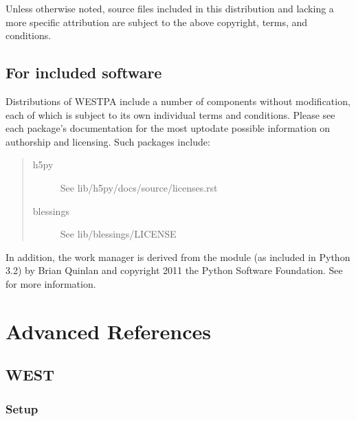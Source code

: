 \documentclass[letterpaper,10pt,english]{sphinxmanual}
\begin{document}
Unless otherwise noted, source files included in this distribution and
lacking a more specific attribution are subject to the above copyright,
terms, and conditions.


\section{For included software}
\label{\detokenize{sphinx_index:for-included-software}}
Distributions of WESTPA include a number of components without modification,
each of which is subject to its own individual terms and conditions. Please
see each package’s documentation for the most up\sphinxhyphen{}to\sphinxhyphen{}date possible information
on authorship and licensing. Such packages include:
\begin{quote}
\begin{description}
\item[{h5py}] \leavevmode
See lib/h5py/docs/source/licenses.rst

\item[{blessings}] \leavevmode
See lib/blessings/LICENSE

\end{description}
\end{quote}

In addition, the  work manager is derived from the
 module (as included in Python 3.2) by Brian Quinlan and
copyright 2011 the Python Software Foundation. See
 for more information.


\chapter{Advanced References}
\label{\detokenize{sphinx_index:advanced-references}}

\section{WEST}
\label{\detokenize{users_guide/west:west}}\label{\detokenize{users_guide/west::doc}}

\subsection{Setup}
\label{\detokenize{users_guide/west/setup:setup}}\label{\detokenize{users_guide/west/setup:id1}}\label{\detokenize{users_guide/west/setup::doc}}
\end{document}
